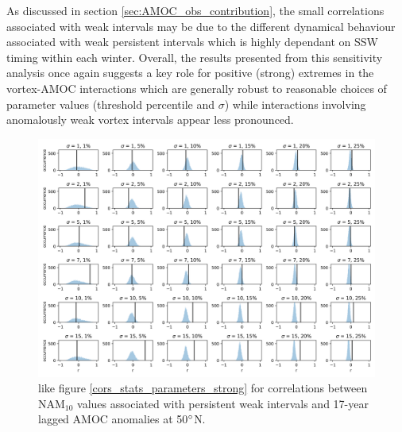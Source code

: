 As discussed in section \ref{sec:AMOC_obs_contribution}, the small correlations associated with weak intervals may be due to the different dynamical behaviour associated with weak persistent intervals which is highly dependant on SSW timing within each winter. Overall, the results presented from this sensitivity analysis once again suggests a key role for positive (strong) extremes in the vortex-AMOC interactions which are generally robust to reasonable choices of parameter values (threshold percentile and $\sigma$) while interactions involving anomalously weak vortex intervals appear less pronounced. 

\newpage
\begin{landscape}
\begin{figure}[h!]
\begin{center}
\noindent\includegraphics[width =0.9\linewidth]{Figures/Figures-surface/cors_sigs_thresh_and_sigma_weak.png} 
\caption[PDFs for correlations between the magnitude of weak NAM$_{10}$ extreme and lagged AMOC for different $\sigma$ and threshold]{like figure \ref{cors_stats_parameters_strong} for correlations between NAM$_{10}$ values associated with persistent weak intervals and 17-year lagged AMOC anomalies at 50$\degree$N.}
\label{cors_stats_parameters_weak}
\end{center}
\end{figure}
\end{landscape}


